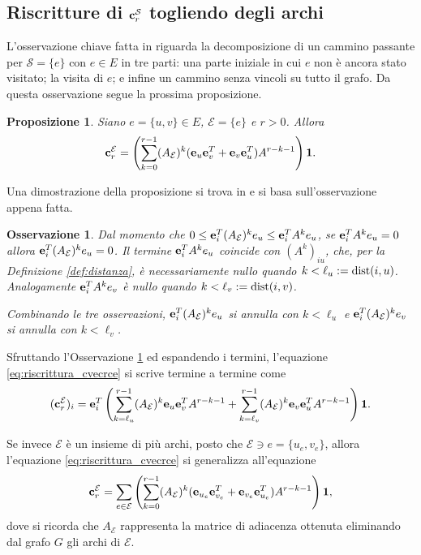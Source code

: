 \documentclass[a4paper]{article}
\newcommand{\dist}{{\rm dist}}
\newcommand{\evec}{{\bf e}}
\newcommand{\cvec}{{\bf c}}
\newcommand{\bone}{\mathbf{1}}
\newcommand{\cS}{\mathcal{S}}
\newcommand{\cE}{\mathcal{E}}
\newtheorem{remark}{Osservazione}
\newtheorem{proposition}{Proposizione}
\begin{document}
\subsection{Riscritture di \texorpdfstring{$\cvec^\cS_r$}{cˢᵣ} togliendo degli archi}

L'osservazione chiave fatta in \cite{katz2024} riguarda la decomposizione di
un cammino passante per $\cS = \{e\}$ con $e \in E$ in tre parti: una parte
iniziale in cui $e$ non è ancora stato visitato; la visita di $e$; e infine
un cammino senza vincoli su tutto il grafo. Da questa osservazione
segue la prossima proposizione.

\begin{proposition}
	Siano $e = \{u, v\} \in E$, $\cE = \{e\}$ e $r > 0$. Allora
	\begin{equation} \label{eq:riscrittura_cvecrce}
		\cvec_r^\cE = \left( \sum_{k = 0}^{r-1} (A_\cE)^k (\evec_u\evec_v^T+\evec_v\evec_u^T)A^{r-k-1} \right) \bone.
	\end{equation}
\end{proposition}

Una dimostrazione della proposizione si trova in \cite[Proposition 1]{katz2024} e si basa sull'osservazione appena fatta.

\begin{remark} \label{remark:riscrittura_crei}
	Dal momento che $0 \leq \evec_i^T (A_\cE)^k e_u \leq \evec_i^T A^k e_u$,
	se $\evec_i^T A^k e_u = 0$ allora $\evec_i^T (A_\cE)^k e_u = 0$.
	Il termine $\evec_i^T A^k e_u$ coincide con $(A^k)_{iu}$, che,
	per la Definizione \ref{def:distanza}, è necessariamente nullo
	quando $k < \ell_u := \dist(i, u)$. Analogamente $\evec_i^T A^k e_v$
	è nullo quando $k < \ell_v := \dist(i, v)$.
	
	Combinando le tre osservazioni, $\evec_i^T (A_\cE)^k e_u$ si annulla
	con $k < \ell_u$ e $\evec_i^T (A_\cE)^k e_v$ si annulla con $k < \ell_v$.
\end{remark}

Sfruttando l'Osservazione \ref{remark:riscrittura_crei} ed espandendo i termini, l'equazione \eqref{eq:riscrittura_cvecrce} si scrive termine
a termine come
\begin{equation}
	(\cvec_r^\cE)_i = \evec_i^T \left( \sum_{k = \ell_u}^{r-1} (A_\cE)^k\evec_u\evec_v^TA^{r-k-1} + \sum_{k = \ell_v}^{r-1} (A_\cE)^k\evec_v\evec_u^TA^{r-k-1} \right) \bone.
\end{equation}

Se invece $\cE$ è un insieme di più archi, posto che $\cE \ni e = \{u_e, v_e\}$, allora l'equazione \eqref{eq:riscrittura_cvecrce} si generalizza
all'equazione
\begin{equation} \label{eq:riscrittura_più_archi}
	\cvec_r^\cE = \sum_{e \in \cE} \left( \sum_{k = 0}^{r-1} (A_\cE)^k (\evec_{u_e}\evec_{v_e}^T+\evec_{v_e}\evec_{u_e}^T)A^{r-k-1} \right) \bone,
\end{equation}
dove si ricorda che $A_\cE$ rappresenta la matrice di adiacenza ottenuta
eliminando dal grafo $G$ gli archi di $\cE$.
\end{document}
